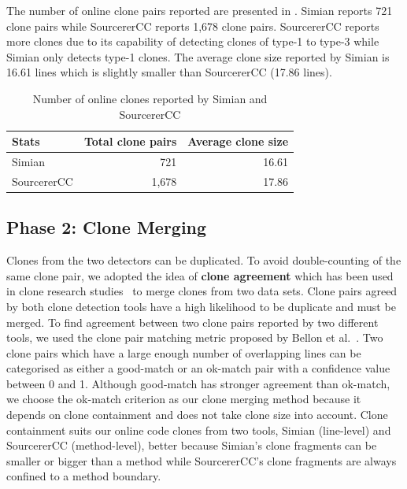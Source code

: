 \documentclass[10pt,journal,compsoc]{IEEEtran}
\begin{document}
The number of online clone pairs reported %
are presented in . Simian reports 721 clone
pairs while SourcererCC reports 1,678 clone pairs. 
SourcererCC reports more clones due to its capability of detecting
clones of type-1 to type-3 while Simian only detects type-1 clones.
The average clone size reported by Simian is
16.61 lines which is slightly smaller than SourcererCC (17.86 lines).

\begin{table}
	\centering
	\caption{Number of online clones reported by Simian and SourcererCC}
	\label{tab:orig_stats}
	\begin{tabular}{lrr}
		\toprule
		Stats & \multicolumn{1}{c}{Total clone pairs} & \multicolumn{1}{c}{Average clone size} \\
		\midrule
		Simian & 721 & 16.61 \\
		SourcererCC & 1,678 & 17.86 \\
		\bottomrule
	\end{tabular} %
\end{table}

\subsection{Phase 2: Clone Merging} Clones from the two detectors can be
duplicated. To avoid double-counting of the same clone pair, we adopted the idea
of \textbf{clone agreement} which has been used in clone research
studies~\cite{Funaro2010, Wang2013,cr2016ssbse} to merge clones from two data
sets. Clone pairs agreed by both clone detection tools have a high
likelihood to be duplicate and must be merged. 
To find agreement between two clone
pairs reported by two different tools, we used the clone pair matching metric
proposed by Bellon et al.~\cite{Bellon2007}. Two clone pairs which have a large
enough number of overlapping lines can be categorised as either a good-match or
an ok-match pair with a
confidence value between 0 and 1. Although good-match has stronger agreement
than ok-match, we choose the ok-match criterion as our clone merging method
because it depends on clone containment and does
not take clone size into account. Clone containment suits our online code clones
from two tools, Simian (line-level) and SourcererCC (method-level), better
because Simian's clone fragments can be smaller or bigger than a method
while SourcererCC's clone fragments are always confined to a method boundary.
\end{document}
